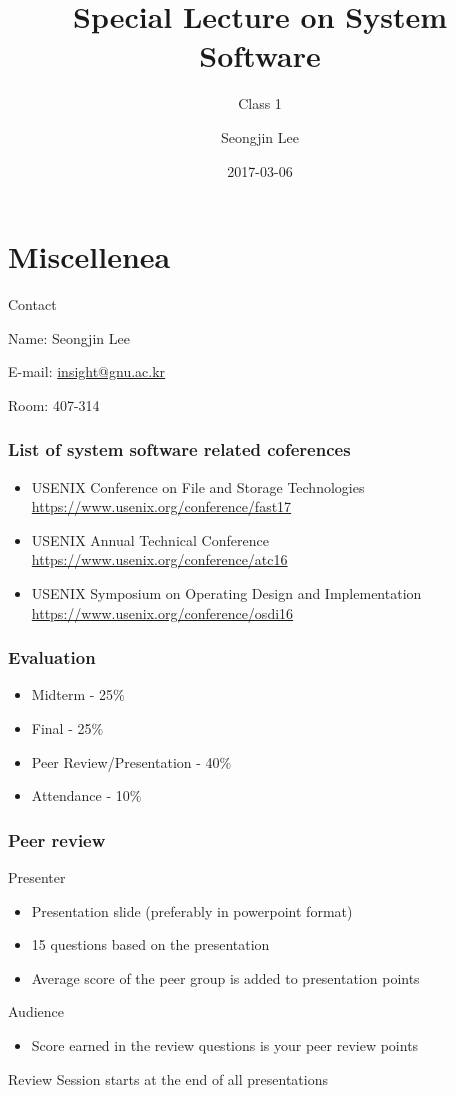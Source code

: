 \documentclass[newPxFont,sthlmFooter,nooffset]{beamer}
\title{Special Lecture on System Software}
\subtitle{Class 1}
\author[SJL]{Seongjin Lee}
\institute{\href{mailto:insight@gnu.ac.kr}{insight@gnu.ac.kr}\\\url{http://resourceful.github.io}\\Systems Research Lab.\\GNU}
\date{2017-03-06}
\begin{document}
\frame[plain,t]{\titlepage} 



\section{Miscellenea} 


\begin{frame}[t]{Contact}

Name: Seongjin Lee

E-mail: \url{insight@gnu.ac.kr}

Room: 407-314


\end{frame}


\begin{frame}
  \frametitle{List of system software related coferences}
  \begin{itemize}
  \item USENIX Conference on File and Storage Technologies \url{https://www.usenix.org/conference/fast17}
  \item USENIX Annual Technical Conference \url{https://www.usenix.org/conference/atc16}
  \item USENIX Symposium on Operating Design and Implementation \url{https://www.usenix.org/conference/osdi16}
  \end{itemize}
\end{frame}



\begin{frame}[t]
  \frametitle{Evaluation}
  \begin{itemize}
  \item Midterm - 25$\%$
  \item Final - 25$\%$
  \item Peer Review/Presentation - 40$\%$ 
  \item Attendance - 10$\%$
  \end{itemize}
\end{frame}


\begin{frame}
  \frametitle{Peer review}

Presenter 
\begin{itemize}
\item Presentation slide (preferably in powerpoint format)
\item 15 questions based on the presentation
\item Average score of the peer group is added to presentation points
\end{itemize}

Audience
\begin{itemize}
\item Score earned in the review questions is your peer review points
\end{itemize}

Review Session starts at the end of all presentations
\end{frame}
\end{document}
